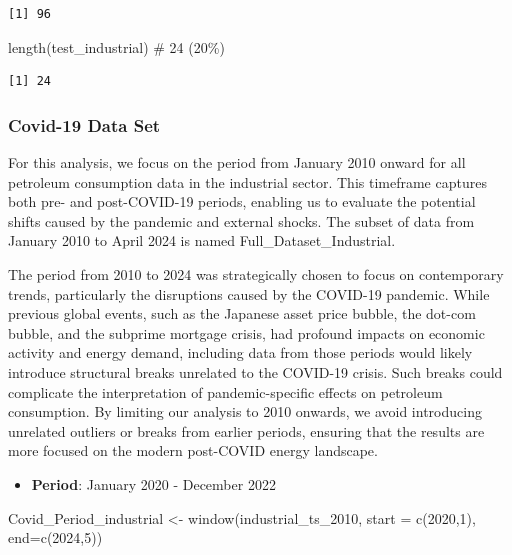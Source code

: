 \documentclass[
  letterpaper,
  DIV=11,
  numbers=noendperiod]{scrartcl}
\newenvironment{Shaded}{\begin{snugshade}}{\end{snugshade}}
\newcommand{\AttributeTok}[1]{\textcolor[rgb]{0.40,0.45,0.13}{#1}}
\newcommand{\CommentTok}[1]{\textcolor[rgb]{0.37,0.37,0.37}{#1}}
\newcommand{\DecValTok}[1]{\textcolor[rgb]{0.68,0.00,0.00}{#1}}
\newcommand{\FunctionTok}[1]{\textcolor[rgb]{0.28,0.35,0.67}{#1}}
\newcommand{\NormalTok}[1]{\textcolor[rgb]{0.00,0.23,0.31}{#1}}
\newcommand{\OtherTok}[1]{\textcolor[rgb]{0.00,0.23,0.31}{#1}}
\providecommand{\tightlist}{%
  \setlength{\itemsep}{0pt}\setlength{\parskip}{0pt}}\usepackage{longtable,booktabs,array}
\begin{document}
\begin{verbatim}
[1] 96
\end{verbatim}

\begin{Shaded}
\begin{Highlighting}[]
\FunctionTok{length}\NormalTok{(test\_industrial) }\CommentTok{\# 24 (20\%)}
\end{Highlighting}
\end{Shaded}

\begin{verbatim}
[1] 24
\end{verbatim}

\subsubsection{Covid-19 Data Set}\label{covid-19-data-set}

For this analysis, we focus on the period from January 2010 onward for
all petroleum consumption data in the industrial sector. This timeframe
captures both pre- and post-COVID-19 periods, enabling us to evaluate
the potential shifts caused by the pandemic and external shocks. The
subset of data from January 2010 to April 2024 is named
Full\_Dataset\_Industrial.

The period from 2010 to 2024 was strategically chosen to focus on
contemporary trends, particularly the disruptions caused by the COVID-19
pandemic. While previous global events, such as the Japanese asset price
bubble, the dot-com bubble, and the subprime mortgage crisis, had
profound impacts on economic activity and energy demand, including data
from those periods would likely introduce structural breaks unrelated to
the COVID-19 crisis. Such breaks could complicate the interpretation of
pandemic-specific effects on petroleum consumption. By limiting our
analysis to 2010 onwards, we avoid introducing unrelated outliers or
breaks from earlier periods, ensuring that the results are more focused
on the modern post-COVID energy landscape.

\begin{itemize}
\tightlist
\item
  \textbf{Period}: January 2020 - December 2022
\end{itemize}

\begin{Shaded}
\begin{Highlighting}[]
\NormalTok{Covid\_Period\_industrial }\OtherTok{\textless{}{-}} \FunctionTok{window}\NormalTok{(industrial\_ts\_2010, }\AttributeTok{start =} \FunctionTok{c}\NormalTok{(}\DecValTok{2020}\NormalTok{,}\DecValTok{1}\NormalTok{), }\AttributeTok{end=}\FunctionTok{c}\NormalTok{(}\DecValTok{2024}\NormalTok{,}\DecValTok{5}\NormalTok{))}
\end{Highlighting}
\end{Shaded}
\end{document}
